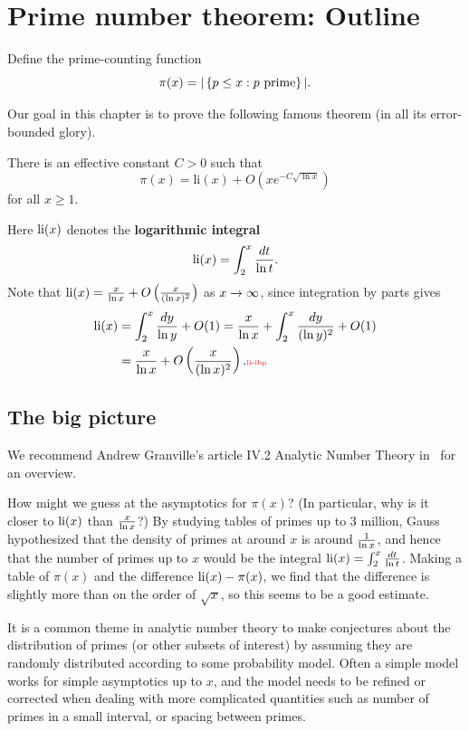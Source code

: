 \section{Prime number theorem: Outline}
\begin{df}
Define the prime-counting function
\[
\pi(x)=|\left\{{p\le x}:{p\text{ prime}}\right\}|.
\]
\end{df}
Our goal in this chapter is to prove the following famous theorem (in all its error-bounded glory).
\begin{thm}
There is an effective constant $C>0$ such that
\[
\pi(x)=\text{li}(x)+O(xe^{-C\sqrt{\ln x}})
\]
for all $x\ge 1$.
\end{thm}
Here $\operatorname{li}(x)$ denotes the \textbf{logarithmic integral}
\[
\operatorname{li}(x)=\int_2^x \frac{dt}{\ln t}.
\]
Note that $\operatorname{li}(x)= \frac{x}{\ln x}+O\left( {\frac{x}{(\ln x)^2}} \right)$ as $x\to \infty$, since integration by parts gives
\begin{align}
\nonumber\li(x)&=\int_2^x \frac{dy}{\ln y} +O(1)=\frac{x}{\ln x}+\int_2^x \frac{dy}{(\ln y)^2}+O(1)\\
&=\frac{x}{\ln x}+O\pf{x}{(\ln x)^2}.\llabel{li-ibp}
\end{align}

\subsection{The big picture}

We recommend Andrew Granville's article IV.2 Analytic Number Theory in~\cite{PCTM} for an overview.

How might we guess at the asymptotics for $\pi(x)$? (In particular, why is it closer to $\operatorname{li}(x)$ than $\frac{x}{\ln x}$?) By studying tables of primes up to 3 million, Gauss hypothesized that the density of primes at around $x$ is around $\frac{1}{\ln x}$, and hence that the number of primes up to $x$ would be the integral $\operatorname{li}(x)=\int_2^x \frac{dt}{\ln t}$. Making a table of $\pi(x)$ and the difference $\operatorname{li}(x)-\pi(x)$, we find that the difference is slightly more than on the order of $\sqrt x$, so this seems to be a good estimate.

It is a common theme in analytic number theory to make conjectures about the distribution of primes (or other subsets of interest) by assuming they are randomly distributed according to some probability model. Often a simple model works for simple asymptotics up to $x$, and the model needs to be refined or corrected when dealing with more complicated quantities such as number of primes in a small interval, or spacing between primes.

